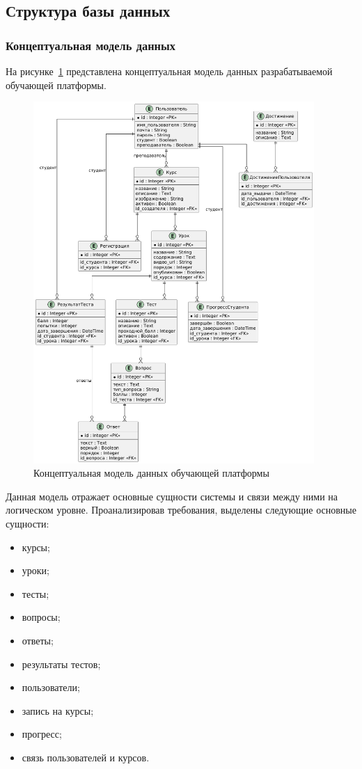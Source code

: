 \subsection{Структура базы данных}

\subsubsection{Концептуальная модель данных}

На рисунке~\ref{conceptual_model} представлена концептуальная модель данных разрабатываемой обучающей платформы.

\begin{figure}[H]
	\centering
	\includegraphics[width=0.95\textwidth]{images/концептуальная}
	\caption{Концептуальная модель данных обучающей платформы}
	\label{conceptual_model}
\end{figure}

Данная модель отражает основные сущности системы и связи между ними на логическом уровне.
Проанализировав требования, выделены следующие основные сущности:
\begin{itemize}
	\item курсы;
	\item уроки;
	\item тесты;
	\item вопросы;
	\item ответы;
	\item результаты тестов;
	\item пользователи;
	\item запись на курсы;
	\item прогресс;
	\item связь пользователей и курсов.
\end{itemize}

